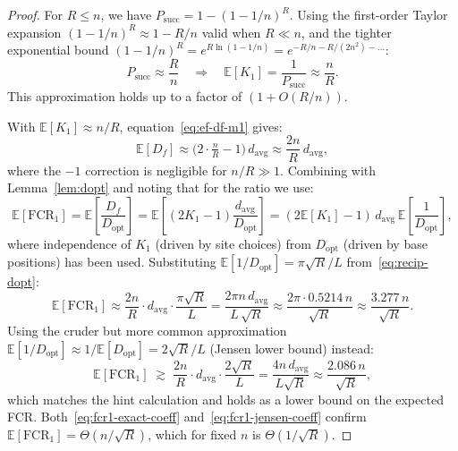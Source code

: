 \begin{proof}
For $R \leq n$, we have $P_{\mathrm{succ}} = 1-(1-1/n)^R$.
Using the first-order Taylor expansion $(1-1/n)^R \approx 1 - R/n$ valid
when $R \ll n$, and the tighter exponential bound $(1-1/n)^R =
e^{R\ln(1-1/n)} = e^{-R/n - R/(2n^2) - \ldots}$:
\begin{equation}
  P_{\mathrm{succ}} \approx \frac{R}{n}
  \quad\Rightarrow\quad
  \mathbb{E}[K_1] = \frac{1}{P_{\mathrm{succ}}} \approx \frac{n}{R}.
\end{equation}
This approximation holds up to a factor of $(1 + O(R/n))$.

With $\mathbb{E}[K_1] \approx n/R$, equation~\eqref{eq:ef-df-m1} gives:
\[
  \mathbb{E}[D_f]
  \approx \bigl(2\cdot\tfrac{n}{R} - 1\bigr)\,d_{\mathrm{avg}}
  \approx \frac{2n}{R}\,d_{\mathrm{avg}},
\]
where the $-1$ correction is negligible for $n/R \gg 1$.
Combining with Lemma~\ref{lem:dopt} and noting that for the ratio we use:
\begin{equation}
  \mathbb{E}[\mathrm{FCR}_1]
  = \mathbb{E}\!\left[\frac{D_f}{D_{\mathrm{opt}}}\right]
  = \mathbb{E}\!\left[(2K_1-1)\frac{d_{\mathrm{avg}}}{D_{\mathrm{opt}}}\right]
  = (2\mathbb{E}[K_1]-1)\,d_{\mathrm{avg}}\,\mathbb{E}\!\left[\frac{1}{D_{\mathrm{opt}}}\right],
\end{equation}
where independence of $K_1$ (driven by site choices) from $D_{\mathrm{opt}}$
(driven by base positions) has been used.
Substituting $\mathbb{E}[1/D_{\mathrm{opt}}] = \pi\sqrt{R}/L$
from~\eqref{eq:recip-dopt}:
\begin{equation}
  \mathbb{E}[\mathrm{FCR}_1]
  \approx \frac{2n}{R}\cdot d_{\mathrm{avg}} \cdot \frac{\pi\sqrt{R}}{L}
  = \frac{2\pi n\,d_{\mathrm{avg}}}{L\,\sqrt{R}}
  \approx \frac{2\pi \cdot 0.5214\,n}{\sqrt{R}}
  \approx \frac{3.277\,n}{\sqrt{R}}.
  \label{eq:fcr1-exact-coeff}
\end{equation}
Using the cruder but more common approximation
$\mathbb{E}[1/D_{\mathrm{opt}}] \approx 1/\mathbb{E}[D_{\mathrm{opt}}] = 2\sqrt{R}/L$
(Jensen lower bound) instead:
\begin{equation}
  \mathbb{E}[\mathrm{FCR}_1]
  \;\gtrsim\; \frac{2n}{R}\cdot d_{\mathrm{avg}}\cdot\frac{2\sqrt{R}}{L}
  = \frac{4n\,d_{\mathrm{avg}}}{L\sqrt{R}}
  \approx \frac{2.086\,n}{\sqrt{R}},
  \label{eq:fcr1-jensen-coeff}
\end{equation}
which matches the hint calculation and holds as a lower bound on the
expected FCR.
Both~\eqref{eq:fcr1-exact-coeff} and~\eqref{eq:fcr1-jensen-coeff}
confirm $\mathbb{E}[\mathrm{FCR}_1] = \Theta(n/\sqrt{R})$, which for
fixed $n$ is $\Theta(1/\sqrt{R})$.
\end{proof}

